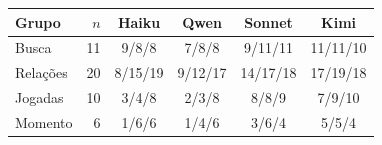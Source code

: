 \begin{tabular}{lrcccc}
\toprule
Grupo & $n$ & Haiku & Qwen & Sonnet & Kimi \\
\midrule
Busca & 11 & 9/8/8 & 7/8/8 & 9/11/11 & 11/11/10 \\
Relações & 20 & 8/15/19 & 9/12/17 & 14/17/18 & 17/19/18 \\
Jogadas & 10 & 3/4/8 & 2/3/8 & 8/8/9 & 7/9/10 \\
Momento & 6 & 1/6/6 & 1/4/6 & 3/6/4 & 5/5/4 \\
\bottomrule
\end{tabular}
